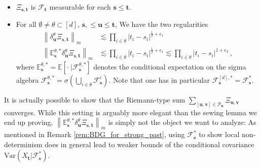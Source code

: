\documentclass[11pt,oneside,english,reqno]{amsart}
\numberwithin{equation}{section}
\numberwithin{figure}{section}
\theoremstyle{plain}
\theoremstyle{definition}
\theoremstyle{remark}
\theoremstyle{plain}
\theoremstyle{plain}
\theoremstyle{plain}
\theoremstyle{plain}
\theoremstyle{plain}
\newcommand{\cF}{\mathcal{F}}
\newcommand{\cP}{\mathcal{P}}
\newcommand{\EE}{\mathbb{E}}
\newcommand{\bn}{\mathbf{n}}
\newcommand{\bu}{\mathbf{u}}
\newcommand{\bv}{\mathbf{v}}
\newcommand{\bs}{\mathbf{s}}
\newcommand{\bt}{\mathbf{t}}
\newcommand{\norm}[1]{\left\lVert #1\right\rVert}
\newcommand{\abs}[1]{\left\lvert #1\right\rvert}
\begin{document}
\begin{itemize}
    \item $\Xi_{\bs,\bt}$ is $\cF_\bt$ measurable for each $\bs\le\bt$.
    \item For all $\emptyset\neq\theta\subset[d]$, $\bs,\le\bu\le\bt$, We have the two regularities
%
    \begin{align}
        \norm{\delta_{\bu}^\theta\Xi_{\bs,\bt}}_m &\lesssim \prod_{i\in\theta}\abs{t_i-s_i}^{\frac 12+\epsilon_1}\label{ineq:coherence_condition1}\\
        \norm{\EE^{\theta,*}_\bs\delta_{\bu}^\theta\Xi_{\bs,\bt}}_m &\lesssim \prod_{i\in\theta}\abs{t_i-s_i}^{\frac 12+\epsilon_1}\lesssim \prod_{i\in\theta}\abs{t_i-s_i}^{1+\epsilon_2}\,,\label{ineq:coherence_*_condition}
    \end{align}
%
    where $\EE^{\theta,*}_\bs = \EE[\cdot~\vert\cF^{\theta,*}_\bs]$ denotes the conditional expectation on the sigma algebra $\cF^{\theta,*}_\bs = \sigma\left(\bigcup_{i\in\theta} \cF_\bs^i\right)$. Note that one has in particular $\cF^{[d],*}_\bs = \cF^*_\bs$.
\end{itemize}
%
It is actually possible to show that the Riemann-type sum $\sum_{[\bu,\bv]\in\cP_\bn}\Xi_{\bu,\bv}$ converges. While this setting is arguably more elegant than the sewing lemma we end up proving, $\norm{\EE^{\theta,*}_\bs\delta_{\bu}^\theta\Xi_{\bs,\bt}}_m$ is simply not the object we want to analyze: As mentioned in Remark \ref{rem:BDG_for_strong_past}, using $\cF^*_\bs$ to show local non-determinism does in general lead to weaker bounds of the conditional covariance $\mbox{Var}(X_\bt\vert\cF_\bs^*)$.
\end{document}
